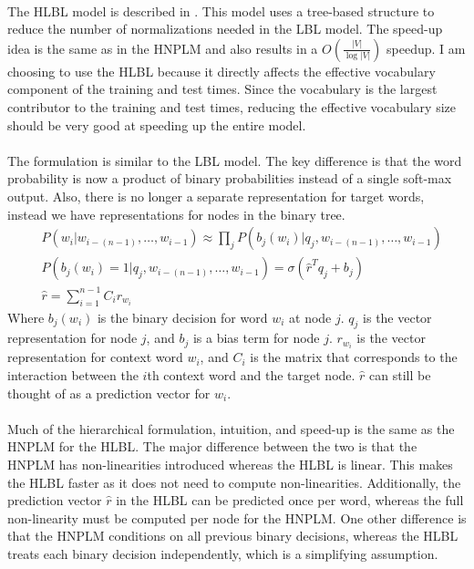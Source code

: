 \paragraph{}
The HLBL model is described in \cite{MnihHinton2009}. This model uses a tree-based structure to reduce the number of normalizations needed in the LBL model. The speed-up idea is the same as in the HNPLM and also results in a $O(\frac{|V|}{\log|V|})$ speedup. I am choosing to use the HLBL because it directly affects the effective vocabulary component of the training and test times. Since the vocabulary is the largest contributor to the training and test times, reducing the effective vocabulary size should be very good at speeding up the entire model.

\paragraph{}
The formulation is similar to the LBL model. The key difference is that the word probability is now a product of binary probabilities instead of a single soft-max output. Also, there is no longer a separate representation for target words, instead we have representations for nodes in the binary tree.
\begin{align}
&P(w_i | w_{i-(n-1)},\dots, w_{i-1})  \approx \prod_j P(b_j(w_i) | q_j, w_{i-(n-1)},\dots, w_{i-1}) \label{eq:HLBL}
\\ 
&P(b_j(w_i) = 1 | q_j, w_{i-(n-1)},\dots, w_{i-1}) =  \sigma( \hat{r}^T q_{j} +b_{j})
\\ 
&\hat{r} = \sum_{i=1}^{n-1} C_i r_{w_i} \nonumber
\end{align}
Where $b_j(w_i)$ is the binary decision for word $w_i$ at node $j$. $q_j$ is the vector representation for node $j$, and $b_{j}$ is a bias term for node $j$. $r_{w_i}$ is the vector representation for context word $w_i$, and $C_i$ is the matrix that corresponds to the interaction between the $i$th context word and the target node.  $\hat{r}$ can still be thought of as a prediction vector for $w_i$. 

\paragraph{}
Much of the hierarchical formulation, intuition, and speed-up is the same as the HNPLM for the HLBL. The major difference between the two is that the HNPLM has non-linearities introduced whereas the HLBL is linear. This makes the HLBL faster as it does not need to compute non-linearities. Additionally, the prediction vector $\hat{r}$ in the HLBL can be predicted once per word, whereas the full non-linearity must be computed per node for the HNPLM. One other difference is that the HNPLM conditions on all previous binary decisions, whereas the HLBL treats each binary decision independently, which is a simplifying assumption. 


